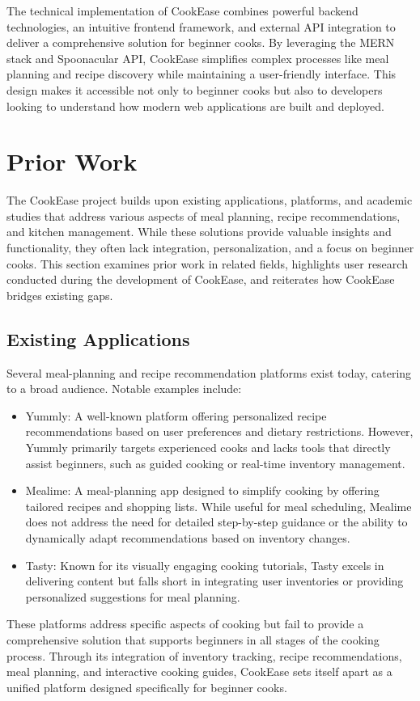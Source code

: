 \documentclass[10pt,twocolumn]{article}
\begin{document}
The technical implementation of CookEase combines powerful backend technologies, an intuitive frontend framework, and external API integration to deliver a comprehensive solution for beginner cooks. By leveraging the MERN stack and Spoonacular API, CookEase simplifies complex processes like meal planning and recipe discovery while maintaining a user-friendly interface. This design makes it accessible not only to beginner cooks but also to developers looking to understand how modern web applications are built and deployed.

\section{Prior Work}
The CookEase project builds upon existing applications, platforms, and academic studies that address various aspects of meal planning, recipe recommendations, and kitchen management. While these solutions provide valuable insights and functionality, they often lack integration, personalization, and a focus on beginner cooks. This section examines prior work in related fields, highlights user research conducted during the development of CookEase, and reiterates how CookEase bridges existing gaps.

\subsection{Existing Applications}
Several meal-planning and recipe recommendation platforms exist today, catering to a broad audience. Notable examples include:
\begin{itemize}
    \item Yummly: A well-known platform offering personalized recipe recommendations based on user preferences and dietary restrictions. However, Yummly primarily targets experienced cooks and lacks tools that directly assist beginners, such as guided cooking or real-time inventory management.
    \item Mealime: A meal-planning app designed to simplify cooking by offering tailored recipes and shopping lists. While useful for meal scheduling, Mealime does not address the need for detailed step-by-step guidance or the ability to dynamically adapt recommendations based on inventory changes.
    \item Tasty: Known for its visually engaging cooking tutorials, Tasty excels in delivering content but falls short in integrating user inventories or providing personalized suggestions for meal planning.
\end{itemize}
These platforms address specific aspects of cooking but fail to provide a comprehensive solution that supports beginners in all stages of the cooking process. Through its integration of inventory tracking, recipe recommendations, meal planning, and interactive cooking guides, CookEase sets itself apart as a unified platform designed specifically for beginner cooks.
\end{document}
